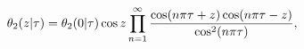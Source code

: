 \[\mathop{\theta_{2}\/}\nolimits\!\left(z\middle|\tau\right)=\mathop{\theta_{2}%
\/}\nolimits\!\left(0\middle|\tau\right)\mathop{\cos\/}\nolimits z\prod_{n=1}^%
{\infty}\frac{\mathop{\cos\/}\nolimits\!\left(n\pi\tau+z\right)\mathop{\cos\/}%
\nolimits\!\left(n\pi\tau-z\right)}{{\mathop{\cos\/}\nolimits^{2}}\!\left(n\pi%
\tau\right)},\]